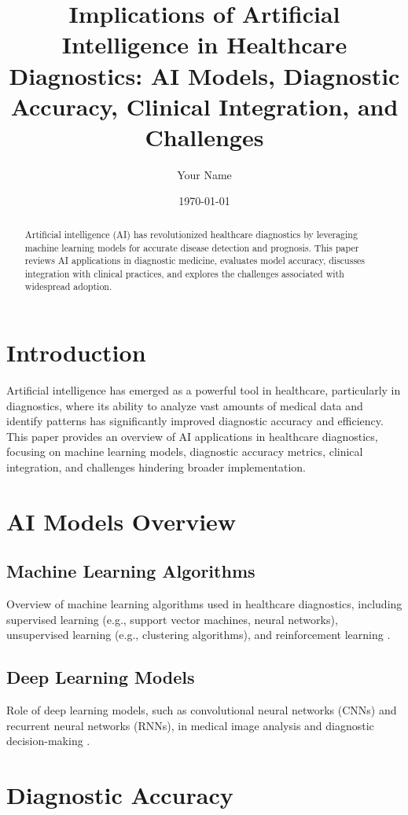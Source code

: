 \documentclass[12pt]{article}
\title{Implications of Artificial Intelligence in Healthcare Diagnostics: AI Models, Diagnostic Accuracy, Clinical Integration, and Challenges}
\author{Your Name}
\date{\today}
\begin{document}
\maketitle

\begin{abstract}
Artificial intelligence (AI) has revolutionized healthcare diagnostics by leveraging machine learning models for accurate disease detection and prognosis. This paper reviews AI applications in diagnostic medicine, evaluates model accuracy, discusses integration with clinical practices, and explores the challenges associated with widespread adoption.
\end{abstract}

\section{Introduction}
Artificial intelligence has emerged as a powerful tool in healthcare, particularly in diagnostics, where its ability to analyze vast amounts of medical data and identify patterns has significantly improved diagnostic accuracy and efficiency. This paper provides an overview of AI applications in healthcare diagnostics, focusing on machine learning models, diagnostic accuracy metrics, clinical integration, and challenges hindering broader implementation.

\section{AI Models Overview}
\subsection{Machine Learning Algorithms}
Overview of machine learning algorithms used in healthcare diagnostics, including supervised learning (e.g., support vector machines, neural networks), unsupervised learning (e.g., clustering algorithms), and reinforcement learning \citep{esteva2017dermatologist, gulshan2016development}.

\subsection{Deep Learning Models}
Role of deep learning models, such as convolutional neural networks (CNNs) and recurrent neural networks (RNNs), in medical image analysis and diagnostic decision-making \citep{litjens2017survey, shen2017deep}.

\section{Diagnostic Accuracy}
\end{document}
